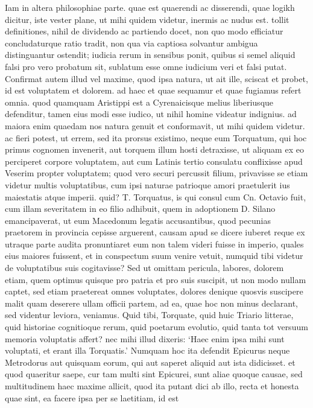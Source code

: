 \documentclass[
  a4paper,
]{book}
\numberwithin{equation}{section}
\theoremstyle{plain}
\theoremstyle{remark}
\begin{document}
Iam in altera philosophiae parte. quae est quaerendi ac disserendi, quae
logikh dicitur, iste vester plane, ut mihi quidem videtur, inermis ac
nudus est. tollit definitiones, nihil de dividendo ac partiendo docet,
non quo modo efficiatur concludaturque ratio tradit, non qua via
captiosa solvantur ambigua distinguantur ostendit; iudicia rerum in
sensibus ponit, quibus si semel aliquid falsi pro vero probatum sit,
sublatum esse omne iudicium veri et falsi putat. Confirmat autem illud
vel maxime, quod ipsa natura, ut ait ille, sciscat et probet, id est
voluptatem et dolorem. ad haec et quae sequamur et quae fugiamus refert
omnia. quod quamquam Aristippi est a Cyrenaicisque melius liberiusque
defenditur, tamen eius modi esse iudico, ut nihil homine videatur
indignius. ad maiora enim quaedam nos natura genuit et conformavit, ut
mihi quidem videtur. ac fieri potest, ut errem, sed ita prorsus
existimo, neque eum Torquatum, qui hoc primus cognomen invenerit, aut
torquem illum hosti detraxisse, ut aliquam ex eo perciperet corpore
voluptatem, aut cum Latinis tertio consulatu conflixisse apud Veserim
propter voluptatem; quod vero securi percussit filium, privavisse se
etiam videtur multis voluptatibus, cum ipsi naturae patrioque amori
praetulerit ius maiestatis atque imperii. quid? T. Torquatus, is qui
consul cum Cn. Octavio fuit, cum illam severitatem in eo filio adhibuit,
quem in adoptionem D. Silano emancipaverat, ut eum Macedonum legatis
accusantibus, quod pecunias praetorem in provincia cepisse arguerent,
causam apud se dicere iuberet reque ex utraque parte audita pronuntiaret
eum non talem videri fuisse in imperio, quales eius maiores fuissent, et
in conspectum suum venire vetuit, numquid tibi videtur de voluptatibus
suis cogitavisse? Sed ut omittam pericula, labores, dolorem etiam, quem
optimus quisque pro patria et pro suis suscipit, ut non modo nullam
captet, sed etiam praetereat omnes voluptates, dolores denique quosvis
suscipere malit quam deserere ullam officii partem, ad ea, quae hoc non
minus declarant, sed videntur leviora, veniamus. Quid tibi, Torquate,
quid huic Triario litterae, quid historiae cognitioque rerum, quid
poetarum evolutio, quid tanta tot versuum memoria voluptatis affert? nec
mihi illud dixeris: `Haec enim ipsa mihi sunt voluptati, et erant illa
Torquatis.' Numquam hoc ita defendit Epicurus neque Metrodorus aut
quisquam eorum, qui aut saperet aliquid aut ista didicisset. et quod
quaeritur saepe, cur tam multi sint Epicurei, sunt aliae quoque causae,
sed multitudinem haec maxime allicit, quod ita putant dici ab illo,
recta et honesta quae sint, ea facere ipsa per se laetitiam, id est
\end{document}
